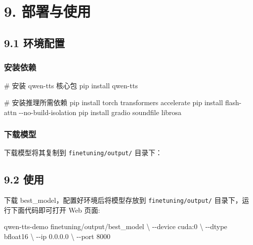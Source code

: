 \documentclass[
  english,
  letterpaper,
  DIV=11,
  numbers=noendperiod]{scrartcl}
\newenvironment{Shaded}{\begin{snugshade}}{\end{snugshade}}
\newcommand{\AttributeTok}[1]{\textcolor[rgb]{0.40,0.45,0.13}{#1}}
\newcommand{\CommentTok}[1]{\textcolor[rgb]{0.37,0.37,0.37}{#1}}
\newcommand{\DecValTok}[1]{\textcolor[rgb]{0.68,0.00,0.00}{#1}}
\newcommand{\ExtensionTok}[1]{\textcolor[rgb]{0.00,0.23,0.31}{#1}}
\newcommand{\FloatTok}[1]{\textcolor[rgb]{0.68,0.00,0.00}{#1}}
\newcommand{\NormalTok}[1]{\textcolor[rgb]{0.00,0.23,0.31}{#1}}
\newcommand{\OperatorTok}[1]{\textcolor[rgb]{0.37,0.37,0.37}{#1}}
\begin{document}
\section{9. 部署与使用}\label{sec-deploy}

\subsection{9.1 环境配置}\label{ux73afux5883ux914dux7f6e}

\subsubsection{安装依赖}\label{ux5b89ux88c5ux4f9dux8d56}

\begin{Shaded}
\begin{Highlighting}[]
\CommentTok{\# 安装 qwen{-}tts 核心包}
\ExtensionTok{pip}\NormalTok{ install qwen{-}tts}

\CommentTok{\# 安装推理所需依赖}
\ExtensionTok{pip}\NormalTok{ install torch transformers accelerate}
\ExtensionTok{pip}\NormalTok{ install flash{-}attn }\AttributeTok{{-}{-}no{-}build{-}isolation}
\ExtensionTok{pip}\NormalTok{ install gradio soundfile librosa}
\end{Highlighting}
\end{Shaded}

\subsubsection{下载模型}\label{ux4e0bux8f7dux6a21ux578b}

下载模型将其复制到 \texttt{finetuning/output/} 目录下：

\subsection{9.2 使用}\label{ux4f7fux7528}

下载 best\_model，配置好环境后将模型存放到 \texttt{finetuning/output/}
目录下，运行下面代码即可打开 Web 页面:

\begin{Shaded}
\begin{Highlighting}[]
\NormalTok{qwen}\OperatorTok{{-}}\NormalTok{tts}\OperatorTok{{-}}\NormalTok{demo finetuning}\OperatorTok{/}\NormalTok{output}\OperatorTok{/}\NormalTok{best\_model }\OperatorTok{\textbackslash{}}
  \OperatorTok{{-}{-}}\NormalTok{device cuda:}\DecValTok{0} \OperatorTok{\textbackslash{}}
  \OperatorTok{{-}{-}}\NormalTok{dtype bfloat16 }\OperatorTok{\textbackslash{}}
  \OperatorTok{{-}{-}}\NormalTok{ip }\FloatTok{0.0.0.0} \OperatorTok{\textbackslash{}}
  \OperatorTok{{-}{-}}\NormalTok{port }\DecValTok{8000}
\end{Highlighting}
\end{Shaded}
\end{document}

